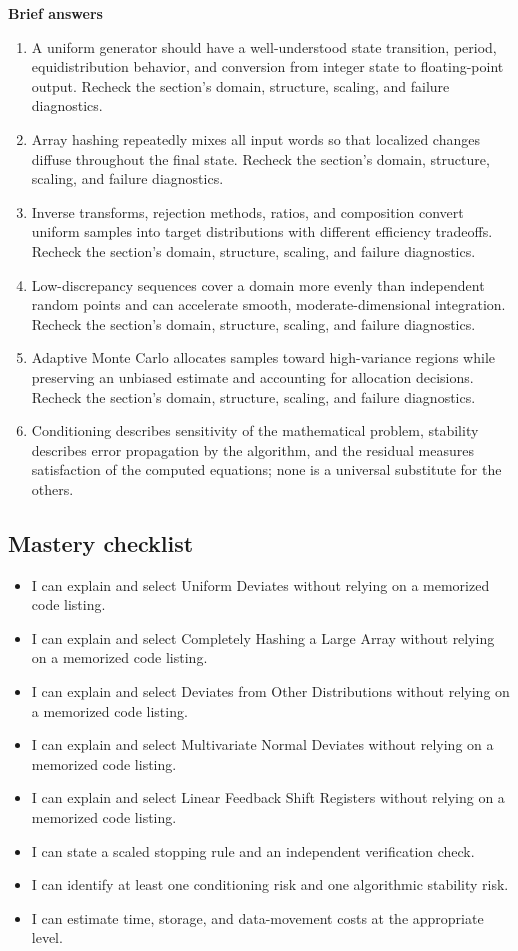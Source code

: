 \documentclass[10pt,letterpaper]{article}
\begin{document}
\textbf{Brief answers}
\begin{enumerate}
\item A uniform generator should have a well-understood state transition, period, equidistribution behavior, and conversion from integer state to floating-point output. Recheck the section's domain, structure, scaling, and failure diagnostics.
\item Array hashing repeatedly mixes all input words so that localized changes diffuse throughout the final state. Recheck the section's domain, structure, scaling, and failure diagnostics.
\item Inverse transforms, rejection methods, ratios, and composition convert uniform samples into target distributions with different efficiency tradeoffs. Recheck the section's domain, structure, scaling, and failure diagnostics.
\item Low-discrepancy sequences cover a domain more evenly than independent random points and can accelerate smooth, moderate-dimensional integration. Recheck the section's domain, structure, scaling, and failure diagnostics.
\item Adaptive Monte Carlo allocates samples toward high-variance regions while preserving an unbiased estimate and accounting for allocation decisions. Recheck the section's domain, structure, scaling, and failure diagnostics.
\item Conditioning describes sensitivity of the mathematical problem, stability describes error propagation by the algorithm, and the residual measures satisfaction of the computed equations; none is a universal substitute for the others.
\end{enumerate}

\subsection*{Mastery checklist}
\begin{itemize}
\item[$\square$] I can explain and select Uniform Deviates without relying on a memorized code listing.
\item[$\square$] I can explain and select Completely Hashing a Large Array without relying on a memorized code listing.
\item[$\square$] I can explain and select Deviates from Other Distributions without relying on a memorized code listing.
\item[$\square$] I can explain and select Multivariate Normal Deviates without relying on a memorized code listing.
\item[$\square$] I can explain and select Linear Feedback Shift Registers without relying on a memorized code listing.
\item[$\square$] I can state a scaled stopping rule and an independent verification check.
\item[$\square$] I can identify at least one conditioning risk and one algorithmic stability risk.
\item[$\square$] I can estimate time, storage, and data-movement costs at the appropriate level.
\end{itemize}
\end{document}
